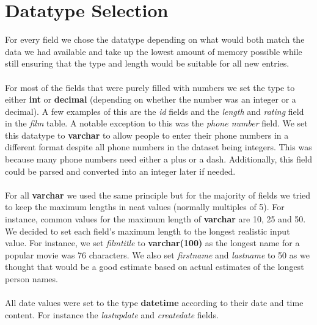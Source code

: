 \documentclass{article}
\begin{document}
\section{Datatype Selection}
	For every field we chose the datatype depending on what would both match the data we had available and take up the lowest amount of memory possible 
	while still ensuring that the type and length would be suitable for all new entries. 
	\\\\
	For most of the fields that were purely filled with numbers we set the type to either \textbf{int} or \textbf{decimal} (depending on whether the number was an integer 
	or a decimal). A few examples of this are the \emph{id} fields and the \emph{length} and \emph{rating} field in the \emph{film} table. A notable exception to this was the 
	\emph{phone number} field. We set this datatype to \textbf{varchar} to allow people to enter their phone numbers in a different format despite all phone numbers in the 
	dataset being integers. This was because many phone numbers need either a plus or a dash. Additionally, this field could be parsed and converted into an integer later if needed.
	\\\\	
	For all \textbf{varchar} we used the same principle but for the majority of fields we tried to keep the maximum lengths in neat values (normally multiples of 5). For instance, common 
	values for the maximum length of \textbf{varchar} are 10, 25 and 50. We decided to set each field’s maximum length to the longest realistic input value.
	For instance, we set \emph{film\textunderscore title} to \textbf{varchar(100)} as the longest name for a popular movie was 76 characters. We also set \emph{first\textunderscore name} and 
	\emph{last\textunderscore name} to 50 as we thought that would be a good estimate based on actual estimates of the longest person names.
	\\\\
	All date values were set to the type \textbf{datetime} according to their date and time content. For instance the \emph{last\textunderscore update} and
	\emph{create\textunderscore date} fields.
	
\end{document}
